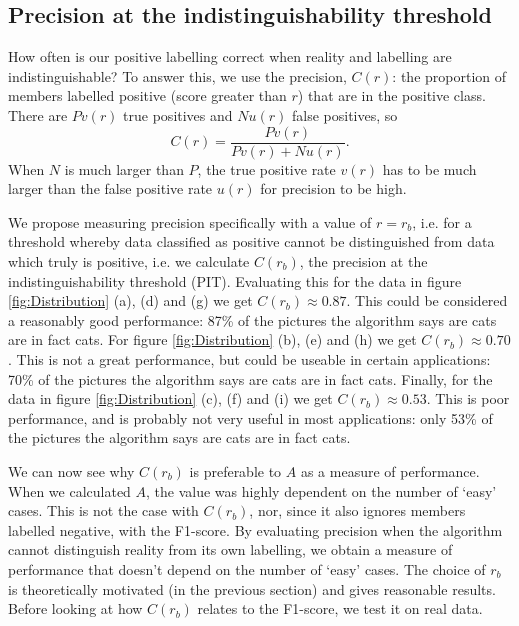 \documentclass[preprint,12pt]{article}
\begin{document}
\subsection*{Precision at the indistinguishability threshold}

\label{PIT}

How often is our positive labelling correct when reality and labelling are indistinguishable? To answer this, we use the precision, $C(r)$: the proportion of members labelled positive (score greater than $r$) that are in the positive class. There are $P v(r)$ true positives and $N u(r)$ false positives, so
\begin{equation}
C(r) = \frac{P v(r)}{P v(r) + N u(r)}. \label{precisionP}
\end{equation}
When $N$ is much larger than $P$, the true positive rate $v(r)$ has to be much larger than the false positive rate $u(r)$ for precision to be high.

We propose measuring precision specifically with a value of $r=r_b$, i.e. for a threshold whereby data classified as positive cannot be distinguished from data which truly is positive, i.e. we calculate $C(r_b)$, the precision at the indistinguishability threshold (PIT). Evaluating this for the data in figure \ref{fig:Distribution} (a), (d) and (g) we get $C(r_b) \approx  0.87$. This could be considered a reasonably good performance: 87\% of the pictures the algorithm says are cats are in fact cats. For figure \ref{fig:Distribution}  (b), (e) and (h) we get $C(r_b) \approx 0.70$. This is not a great performance, but could be useable in certain applications: 70\% of the pictures the algorithm says are cats are in fact cats. Finally, for the data in figure \ref{fig:Distribution} (c), (f) and (i) we get $C(r_b) \approx  0.53$. This is poor performance, and is probably not very useful in most applications: only 53\% of the pictures the algorithm says are cats are in fact cats.

We can now see why $C(r_b)$ is preferable to $A$ as a measure of performance. When we calculated $A$, the value was highly dependent on the number of `easy' cases. This is not the case with $C(r_b)$, nor, since it also ignores members labelled negative, with the F1-score. By evaluating precision when the algorithm cannot distinguish reality from its own labelling, we obtain a measure of performance that doesn't depend on the number of `easy' cases. The choice of $r_b$ is theoretically motivated (in the previous section) and gives reasonable results. Before looking at how $C(r_b)$ relates to the F1-score, we test it on real data. 
\end{document}
